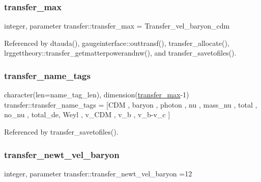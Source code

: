 \subsubsection{\texorpdfstring{transfer\+\_\+max}{transfer\_max}}
{\footnotesize\ttfamily integer, parameter transfer\+::transfer\+\_\+max = Transfer\+\_\+vel\+\_\+baryon\+\_\+cdm}



Referenced by dtauda(), gaugeinterface\+::outtransf(), transfer\+\_\+allocate(), lrggettheory\+::transfer\+\_\+getmatterpowerandnw(), and transfer\+\_\+savetofiles().

\mbox{\label{namespacetransfer_ac02a42ae84b0dbee0b48ed2dd95b6dc8}} 
\subsubsection{\texorpdfstring{transfer\+\_\+name\+\_\+tags}{transfer\_name\_tags}}
{\footnotesize\ttfamily character(len=name\+\_\+tag\+\_\+len), dimension(\mbox{\hyperlink{namespacetransfer_ac87f6542d01968f20465ccd32f02667c}{transfer\+\_\+max}}-\/1) transfer\+::transfer\+\_\+name\+\_\+tags = \mbox{[}\textquotesingle{}C\+DM \textquotesingle{}, \textquotesingle{}baryon \textquotesingle{}, \textquotesingle{}photon \textquotesingle{}, \textquotesingle{}nu \textquotesingle{}, \textquotesingle{}mass\+\_\+nu \textquotesingle{}, \textquotesingle{}total \textquotesingle{}, \textquotesingle{}no\+\_\+nu \textquotesingle{}, \textquotesingle{}total\+\_\+de\textquotesingle{}, \textquotesingle{}Weyl \textquotesingle{}, \textquotesingle{}v\+\_\+\+C\+DM \textquotesingle{}, \textquotesingle{}v\+\_\+b \textquotesingle{}, \textquotesingle{}v\+\_\+b-\/v\+\_\+c \textquotesingle{}\mbox{]}}



Referenced by transfer\+\_\+savetofiles().

\mbox{\label{namespacetransfer_acfa190894a4b625fe771219f23b9bc2f}} 
\subsubsection{\texorpdfstring{transfer\+\_\+newt\+\_\+vel\+\_\+baryon}{transfer\_newt\_vel\_baryon}}
{\footnotesize\ttfamily integer, parameter transfer\+::transfer\+\_\+newt\+\_\+vel\+\_\+baryon =12}



